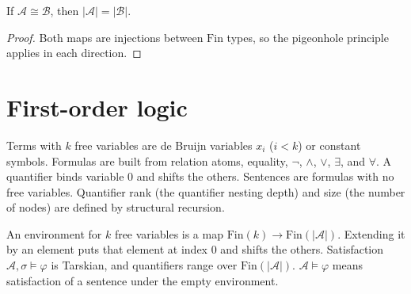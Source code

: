 \begin{theorem}
  \label{thm:desc-iso-card}
  \leanok
  If $\mathcal{A} \cong \mathcal{B}$, then $|\mathcal{A}| = |\mathcal{B}|$.
\end{theorem}
\begin{proof}
  \leanok
  Both maps are injections between $\mathrm{Fin}$ types, so the pigeonhole
  principle applies in each direction.
\end{proof}

\section{First-order logic}

\begin{definition}
  \label{def:desc-fo-syntax}
  \leanok
  Terms with $k$ free variables are de Bruijn variables $x_i$ ($i < k$) or
  constant symbols. Formulas are built from relation atoms, equality, $\neg$,
  $\wedge$, $\vee$, $\exists$, and $\forall$. A quantifier binds variable $0$ and
  shifts the others. Sentences are formulas with no free variables. Quantifier
  rank (the quantifier nesting depth) and size (the number of nodes) are defined
  by structural recursion.
\end{definition}

\begin{definition}
  \label{def:desc-fo-semantics}
  \leanok
  An environment for $k$ free variables is a map
  $\mathrm{Fin}(k) \to \mathrm{Fin}(|\mathcal{A}|)$. Extending it by an element
  puts that element at index $0$ and shifts the others. Satisfaction
  $\mathcal{A}, \sigma \models \varphi$ is Tarskian, and quantifiers range over
  $\mathrm{Fin}(|\mathcal{A}|)$. $\mathcal{A} \models \varphi$ means
  satisfaction of a sentence under the empty environment.
\end{definition}

